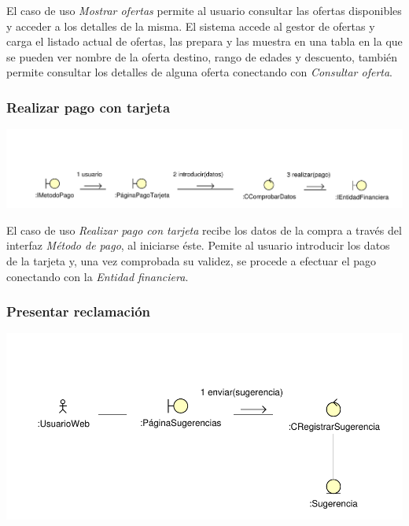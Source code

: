 \documentclass[11pt, a4paper, twoside, titlepage]{article}
\begin{document}
					El caso de uso {\itshape Mostrar ofertas} permite al usuario consultar las ofertas disponibles y acceder a los detalles de la misma.
					El sistema accede al gestor de ofertas y carga el listado actual de ofertas, las prepara y las muestra en una tabla en la que se pueden ver nombre de la oferta destino, rango de edades y descuento, también permite consultar los detalles de alguna oferta conectando con {\itshape Consultar oferta}.

			\subsubsection{Realizar pago con tarjeta} \label{ana:tarjeta}
				\begin{center}
					\includegraphics[scale=.7]{analisis/diagramas/pagotarjeta.pdf}
				\end{center}
				
					El caso de uso {\itshape Realizar pago con tarjeta} recibe los datos de la compra a través del interfaz {\itshape Método de pago}, al iniciarse éste. Pemite al usuario introducir los datos de la tarjeta y, una vez comprobada su validez, se procede a efectuar el pago conectando con la {\itshape Entidad financiera}.

			\subsubsection{Presentar reclamación}
				\begin{center}
					\includegraphics[scale=.82]{analisis/diagramas/presentarreclamacion.pdf}
				\end{center}
				
\end{document}
